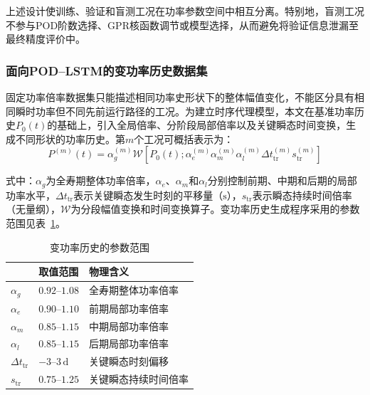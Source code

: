 上述设计使训练、验证和盲测工况在功率参数空间中相互分离。特别地，盲测工况不参与POD阶数选择、GPR核函数调节或模型选择，从而避免将验证信息泄漏至最终精度评价中。

\subsubsection{面向POD--LSTM的变功率历史数据集}

固定功率倍率数据集只能描述相同功率史形状下的整体幅值变化，不能区分具有相同瞬时功率但不同先前运行路径的工况。为建立时序代理模型，本文在基准功率历史$P_0(t)$的基础上，引入全局倍率、分阶段局部倍率以及关键瞬态时间变换，生成不同形状的功率历史。第$m$个工况可概括表示为：
\begin{equation}
	P^{(m)}(t)
	=
	\alpha_g^{(m)}
	\mathcal{W}
	\left[
	P_0(t);
	\alpha_e^{(m)}
	\alpha_m^{(m)}
	\alpha_l^{(m)}
	\Delta t_{\mathrm{tr}}^{(m)}
	s_{\mathrm{tr}}^{(m)}
	\right]
	\label{eq:formal_variable_power_history}
\end{equation}

\noindent 式中：$\alpha_g$为全寿期整体功率倍率，$\alpha_e$、$\alpha_m$和$\alpha_l$分别控制前期、中期和后期的局部功率水平，$\Delta t_{\mathrm{tr}}$表示关键瞬态发生时刻的平移量（$\mathrm{s}$），$s_{\mathrm{tr}}$表示瞬态持续时间倍率（无量纲），$\mathcal W$为分段幅值变换和时间变换算子。变功率历史生成程序采用的参数范围见表~\ref{tab:formal_power_parameter_ranges}。

\begin{table}[htbp]
	\centering
	\caption{变功率历史的参数范围}
	\label{tab:formal_power_parameter_ranges}
	\begin{tabularx}{\textwidth}{@{}
			>{\centering\arraybackslash}X
			>{\centering\arraybackslash}X
			>{\centering\arraybackslash}X
			@{}}
		\toprule
		{\centering 参数\par} & {\centering 取值范围\par} & {\centering 物理含义\par} \\
		\midrule
		$\alpha_g$ & $0.92$--$1.08$ & 全寿期整体功率倍率 \\
		$\alpha_e$ & $0.90$--$1.10$ & 前期局部功率倍率 \\
		$\alpha_m$ & $0.85$--$1.15$ & 中期局部功率倍率 \\
		$\alpha_l$ & $0.85$--$1.15$ & 后期局部功率倍率 \\
		$\Delta t_{\mathrm{tr}}$ & $-3$--$3\,\mathrm{d}$ & 关键瞬态时刻偏移 \\
		$s_{\mathrm{tr}}$ & $0.75$--$1.25$ & 关键瞬态持续时间倍率 \\
		\bottomrule
	\end{tabularx}
\end{table}

